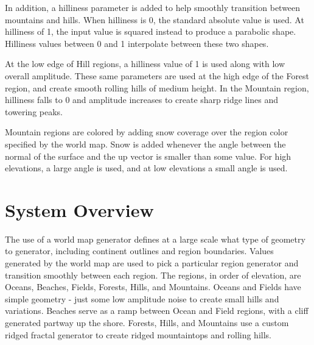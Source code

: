 In addition, a hilliness parameter is added to help smoothly transition between mountains and hills.
When hilliness is 0, the standard absolute value is used.
At hilliness of 1, the input value is squared instead to produce a parabolic shape.
Hilliness values between 0 and 1 interpolate between these two shapes.

At the low edge of Hill regions, a hilliness value of 1 is used along with low overall amplitude.
These same parameters are used at the high edge of the Forest region, and create smooth rolling hills of medium height.
In the Mountain region, hilliness falls to 0 and amplitude increases to create sharp ridge lines and towering peaks.

Mountain regions are colored by adding snow coverage over the region color specified by the world map.
Snow is added whenever the angle between the normal of the surface and the up vector is smaller than some value.
For high elevations, a large angle is used, and at low elevations a small angle is used.

\section{System Overview}

The use of a world map generator defines at a large scale what type of geometry to generator, including continent outlines and region boundaries.
Values generated by the world map are used to pick a particular region generator and transition smoothly between each region.
The regions, in order of elevation, are Oceans, Beaches, Fields, Forests, Hills, and Mountains.
Oceans and Fields have simple geometry - just some low amplitude noise to create small hills and variations.
Beaches serve as a ramp between Ocean and Field regions, with a cliff generated partway up the shore.
Forests, Hills, and Mountains use a custom ridged fractal generator to create ridged mountaintops and rolling hills.

